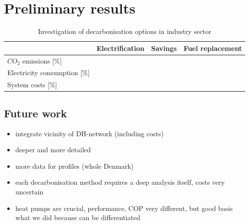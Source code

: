 \documentclass[review]{elsarticle}
\begin{document}

\section{Preliminary results} \label{outcdisc}

\begin{table}[H]
\centering
\caption{Investigation of decarbonisation options in industry sector}
\label{results}
\begin{tabular}{llll}
\hline
 & Electrification & Savings & Fuel replacement \\
\hline
$CO_2$ emissions [\%] &  &  &   \\
Electricity consumption [\%] &  &  &   \\
System costs [\%] &  &  &   \\
\hline
\end{tabular}
\end{table}

\subsection{Future work}
\begin{itemize}
    \item integrate vicinity of DH-network (including costs)
    \item deeper and more detailed
    \item more data for profiles (whole Denmark)
    \item each decarbonisation method requires a deep analysis itself, costs very uncertain
    \item heat pumps are crucial, performance, COP very different, but good basis what we did because can be differentiated
\end{itemize}
\end{document}
